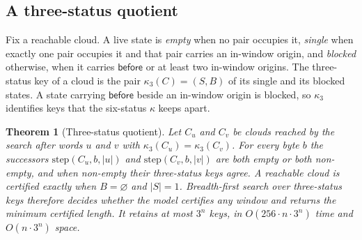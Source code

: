 \documentclass[11pt,a4paper]{article}
\theoremstyle{definition}
\theoremstyle{plain}
\newtheorem{theorem}{Theorem}
\newcommand{\before}{\mathsf{before}}
\begin{document}
\subsection{A three-status quotient}
\label{sec:three}

Fix a reachable cloud. A live state is \emph{empty} when no pair occupies it, \emph{single} when exactly one pair
occupies it and that pair carries an in-window origin, and \emph{blocked} otherwise, when it carries $\before$ or at
least two in-window origins. The three-status key of a cloud is the pair $\kappa_3(C) = (S, B)$ of its single and its
blocked states. A state carrying $\before$ beside an in-window origin is blocked, so $\kappa_3$ identifies keys that the
six-status $\kappa$ keeps apart.

\begin{theorem}[Three-status quotient]
\label{thm:three}
Let $C_u$ and $C_v$ be clouds reached by the search after words $u$ and $v$ with $\kappa_3(C_u) = \kappa_3(C_v)$. For
every byte $b$ the successors $\mathrm{step}(C_u, b, |u|)$ and $\mathrm{step}(C_v, b, |v|)$ are both empty or both
non-empty, and when non-empty their three-status keys agree. A reachable cloud is certified exactly when
$B = \varnothing$ and $|S| = 1$. Breadth-first search over three-status keys therefore decides whether the model
certifies any window and returns the minimum certified length. It retains at most $3^n$ keys, in
$O(256 \cdot n \cdot 3^n)$ time and $O(n \cdot 3^n)$ space.
\end{theorem}
\end{document}
